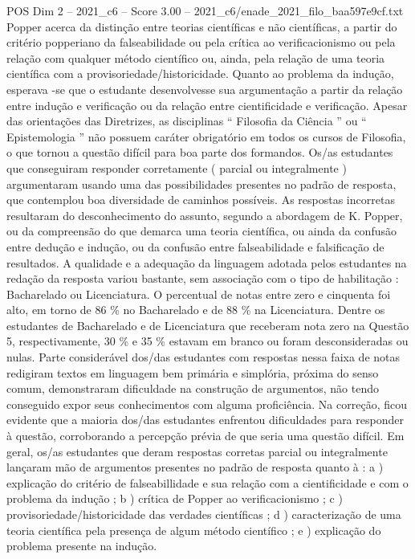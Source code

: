 \begin{textsample}{POS Dim 2 – 2021\_c6 – Score 3.00 – 2021\_c6/enade\_2021\_filo\_baa597e9cf.txt}
Popper acerca da distinção entre teorias científicas e não científicas, a partir do critério popperiano da falseabilidade ou pela crítica ao verificacionismo ou pela relação com qualquer método científico ou, ainda, pela relação de uma teoria científica com a provisoriedade/historicidade.
Quanto ao problema da indução, esperava -se que o estudante desenvolvesse sua argumentação a partir da relação entre indução e verificação ou da relação entre cientificidade e verificação.
Apesar das orientações das Diretrizes, as disciplinas “ Filosofia da Ciência ” ou “ Epistemologia ” não possuem caráter obrigatório em todos os cursos de Filosofia, o que tornou a questão difícil para boa parte dos formandos.
Os/as estudantes que conseguiram responder corretamente ( parcial ou integralmente ) argumentaram usando uma das possibilidades presentes no padrão de resposta, que contemplou boa diversidade de caminhos possíveis.
As respostas incorretas resultaram do desconhecimento do assunto, segundo a abordagem de K.
Popper, ou da compreensão do que demarca uma teoria científica, ou ainda da confusão entre dedução e indução, ou da confusão entre falseabilidade e falsificação de resultados.
A qualidade e a adequação da linguagem adotada pelos estudantes na redação da resposta variou bastante, sem associação com o tipo de habilitação : Bacharelado ou Licenciatura.
O percentual de notas entre zero e cinquenta foi alto, em torno de 86 \% no Bacharelado e de 88 \% na Licenciatura.
Dentre os estudantes de Bacharelado e de Licenciatura que receberam nota zero na Questão 5, respectivamente, 30 \% e 35 \% estavam em branco ou foram desconsideradas ou nulas.
Parte considerável dos/das estudantes com respostas nessa faixa de notas redigiram textos em linguagem bem primária e simplória, próxima do senso comum, demonstraram dificuldade na construção de argumentos, não tendo conseguido expor seus conhecimentos com alguma proficiência.
Na correção, ficou evidente que a maioria dos/das estudantes enfrentou dificuldades para responder à questão, corroborando a percepção prévia de que seria uma questão difícil.
Em geral, os/as estudantes que deram respostas corretas parcial ou integralmente lançaram mão de argumentos presentes no padrão de resposta quanto à : a ) explicação do critério de falseabillidade e sua relação com a cientificidade e com o problema da indução ; b ) crítica de Popper ao verificacionismo ; c ) provisoriedade/historicidade das verdades científicas ; d ) caracterização de uma teoria científica pela presença de algum método científico ; e ) explicação do problema presente na indução.

\end{textsample}
